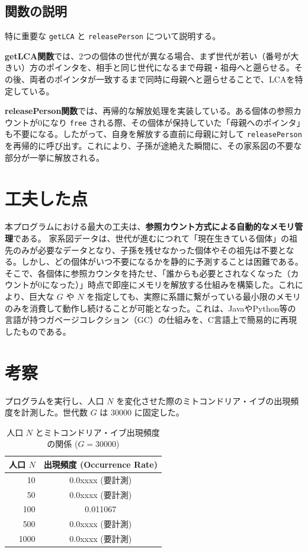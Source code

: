 \documentclass[a4paper,11pt]{jsarticle}
\begin{document}
\subsection{関数の説明}
% 
特に重要な \texttt{getLCA} と \texttt{releasePerson} について説明する。

\textbf{getLCA関数}では、2つの個体の世代が異なる場合、まず世代が若い（番号が大きい）方のポインタを、相手と同じ世代になるまで母親・祖母へと遡らせる。その後、両者のポインタが一致するまで同時に母親へと遡らせることで、LCAを特定している。

\textbf{releasePerson関数}では、再帰的な解放処理を実装している。ある個体の参照カウントが0になり \texttt{free} される際、その個体が保持していた「母親へのポインタ」も不要になる。したがって、自身を解放する直前に母親に対して \texttt{releasePerson} を再帰的に呼び出す。これにより、子孫が途絶えた瞬間に、その家系図の不要な部分が一挙に解放される。

\section{工夫した点}
本プログラムにおける最大の工夫は、\textbf{参照カウント方式による自動的なメモリ管理}である。
家系図データは、世代が進むにつれて「現在生きている個体」の祖先のみが必要なデータとなり、子孫を残せなかった個体やその祖先は不要となる。しかし、どの個体がいつ不要になるかを静的に予測することは困難である。
そこで、各個体に参照カウンタを持たせ、「誰からも必要とされなくなった（カウントが0になった）」時点で即座にメモリを解放する仕組みを構築した。これにより、巨大な $G$ や $N$ を指定しても、実際に系譜に繋がっている最小限のメモリのみを消費して動作し続けることが可能となった。これは、JavaやPython等の言語が持つガベージコレクション（GC）の仕組みを、C言語上で簡易的に再現したものである。

\section{考察}
プログラムを実行し、人口 $N$ を変化させた際のミトコンドリア・イブの出現頻度を計測した。世代数 $G$ は $30000$ に固定した。

\begin{table}[h]
\centering
\caption{人口 $N$ とミトコンドリア・イブ出現頻度の関係 ($G=30000$)}
\begin{tabular}{rc}
\toprule
人口 $N$ & 出現頻度 (Occurrence Rate) \\
\midrule
10 & 0.0xxxx (要計測) \\
50 & 0.0xxxx (要計測) \\
100 & 0.011067 \\
500 & 0.0xxxx (要計測) \\
1000 & 0.0xxxx (要計測) \\
\bottomrule
\end{tabular}
\end{table}
\end{document}
